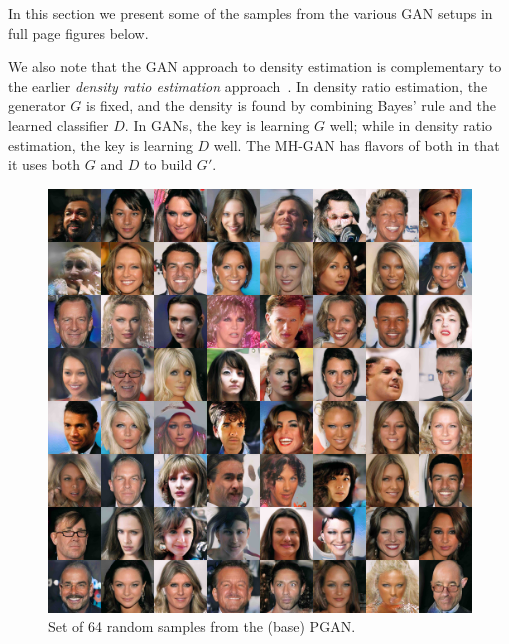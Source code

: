 In this section we present some of the samples from the various GAN setups in full page figures below.

We also note that the GAN approach to density estimation is complementary to the earlier \emph{density ratio estimation} approach~\citep{Sugiyama2012}\@.
In density ratio estimation, the generator $G$ is fixed, and the density is found by combining Bayes' rule and the learned classifier $D$.
In GANs, the key is learning $G$ well; while in density ratio estimation, the key is learning $D$ well.
The MH-GAN has flavors of both in that it uses both $G$ and $D$ to build $G'$.

\begin{figure}[htbp]
    \centering
    \includegraphics[width=\exfactor\textwidth]{figures/pgan/all_base_iso_base_lq.jpg}
    \caption{
    Set of 64 random samples from the (base) PGAN\@.
    }
    \label{fig:PGAN samples}
\end{figure}

